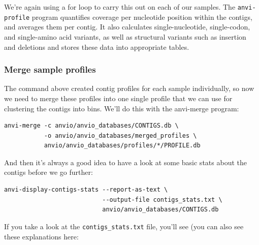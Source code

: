 \documentclass[
]{book}
\begin{document}
We're again using a for loop to carry this out on each of our samples. The \texttt{anvi-profile} program quantifies coverage per nucleotide position within the contigs, and averages them per contig. It also calculates single-nucleotide, single-codon, and single-amino acid variants, as well as structural variants such as insertion and deletions and stores these data into appropriate tables.

\subsubsection{Merge sample profiles}\label{merge-sample-profiles}

The command above created contig profiles for each sample individually, so now we need to merge these profiles into one single profile that we can use for clustering the contigs into bins. We'll do this with the anvi-merge program:

\begin{verbatim}
anvi-merge -c anvio/anvio_databases/CONTIGS.db \
           -o anvio/anvio_databases/merged_profiles \
           anvio/anvio_databases/profiles/*/PROFILE.db
\end{verbatim}

And then it's always a good idea to have a look at some basic stats about the contigs before we go further:

\begin{verbatim}
anvi-display-contigs-stats --report-as-text \
                           --output-file contigs_stats.txt \
                           anvio/anvio_databases/CONTIGS.db
\end{verbatim}

If you take a look at the \texttt{contigs\_stats.txt} file, you'll see (you can also see these explanations here:
\end{document}
